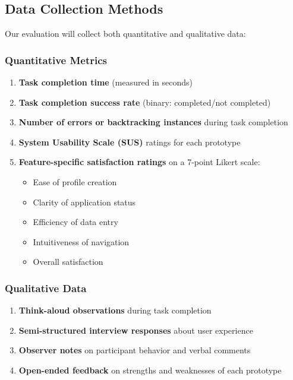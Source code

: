 \documentclass[
	letterpaper, %
]{jdf}
\begin{document}
\begin{sloppypar}
\subsection{Data Collection Methods}

Our evaluation will collect both quantitative and qualitative data:

\subsubsection{Quantitative Metrics}
\begin{enumerate}
    \item \textbf{Task completion time} (measured in seconds)
    \item \textbf{Task completion success rate} (binary: completed/not completed)
    \item \textbf{Number of errors or backtracking instances} during task completion
    \item \textbf{System Usability Scale (SUS)} ratings for each prototype
    \item \textbf{Feature-specific satisfaction ratings} on a 7-point Likert scale:
    \begin{itemize}
        \item Ease of profile creation
        \item Clarity of application status
        \item Efficiency of data entry
        \item Intuitiveness of navigation
        \item Overall satisfaction
    \end{itemize}
\end{enumerate}

\subsubsection{Qualitative Data}
\begin{enumerate}
    \item \textbf{Think-aloud observations} during task completion
    \item \textbf{Semi-structured interview responses} about user experience
    \item \textbf{Observer notes} on participant behavior and verbal comments
    \item \textbf{Open-ended feedback} on strengths and weaknesses of each prototype
\end{enumerate}


\end{sloppypar}
\end{document}
